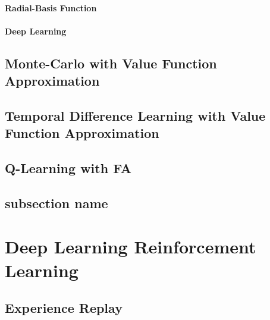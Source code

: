 		\paragraph*{Radial-Basis Function}
		\paragraph*{Deep Learning}

	\subsection{Monte-Carlo with Value Function Approximation} %
		\label{sub:monte_carlo_with_value_function_approximation}
	
	
	\subsection{Temporal Difference Learning with Value Function Approximation} %
	\label{sub:temporal_difference_learning_with_value_function_approximation}

	
	\subsection{Q-Learning with FA} %
	\label{sub:q_learning_with_fa}
	
	
	\subsection{subsection name} %
	\label{sub:subsection_name}
	

\section{Deep Learning Reinforcement Learning} %
	\label{sec:deep_learning_reinforcement_learning}

	\subsection{Experience Replay} %
		\label{sub:experience_replay}
	
